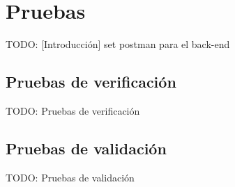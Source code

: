 \chapter{Pruebas\label{cap:pruebas}}

TODO: [Introducción]
set postman para el back-end


\section{Pruebas de verificación\label{sec:pb:verificacion}}

TODO: Pruebas de verificación


\section{Pruebas de validación\label{sec:pb:validacion}}

TODO: Pruebas de validación